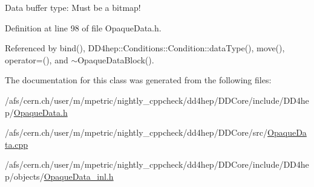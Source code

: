 Data buffer type\+: Must be a bitmap! 



Definition at line 98 of file Opaque\+Data.\+h.



Referenced by bind(), D\+D4hep\+::\+Conditions\+::\+Condition\+::data\+Type(), move(), operator=(), and $\sim$\+Opaque\+Data\+Block().



The documentation for this class was generated from the following files\+:\begin{DoxyCompactItemize}
\item 
/afs/cern.\+ch/user/m/mpetric/nightly\+\_\+cppcheck/dd4hep/\+D\+D\+Core/include/\+D\+D4hep/\hyperlink{_opaque_data_8h}{Opaque\+Data.\+h}\item 
/afs/cern.\+ch/user/m/mpetric/nightly\+\_\+cppcheck/dd4hep/\+D\+D\+Core/src/\hyperlink{_opaque_data_8cpp}{Opaque\+Data.\+cpp}\item 
/afs/cern.\+ch/user/m/mpetric/nightly\+\_\+cppcheck/dd4hep/\+D\+D\+Core/include/\+D\+D4hep/objects/\hyperlink{_opaque_data__inl_8h}{Opaque\+Data\+\_\+inl.\+h}\end{DoxyCompactItemize}
